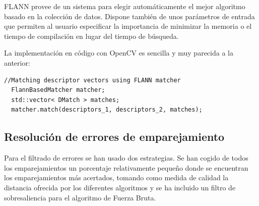 FLANN provee de un sistema para elegir automáticamente el mejor algoritmo basado en la colección de datos. Dispone también de unos parámetros de entrada que permiten al usuario especificar la importancia de minimizar la memoria o el tiempo de compilación en lugar del tiempo de búsqueda.

La implementación en código con OpenCV es sencilla y muy parecida a la anterior:

\begin{lstlisting}[style=CStyle]
  //Matching descriptor vectors using FLANN matcher
  FlannBasedMatcher matcher;
  std::vector< DMatch > matches;
  matcher.match(descriptors_1, descriptors_2, matches);
\end{lstlisting}
\subsection{Resolución de errores de emparejamiento}

Para el filtrado de errores se han usado dos estrategias. Se han cogido de todos los emparejamientos un porcentaje relativamente pequeño donde se encuentran los emparejamientos más acertados, tomando como medida de calidad la distancia ofrecida por los diferentes algoritmos y se ha incluido un filtro de sobresaliencia para el algoritmo de Fuerza Bruta.



